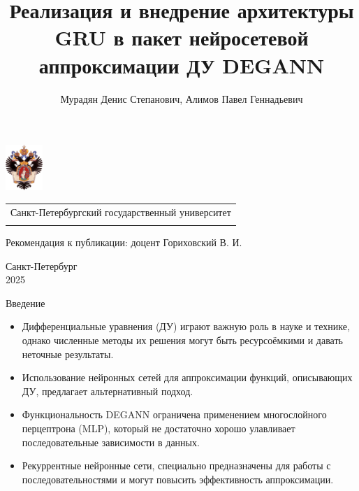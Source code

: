 \documentclass
  [ russian
  , aspectratio=1610 %
  ] {beamer}
\title[GRU в DEGANN]{Реализация и внедрение архитектуры GRU в пакет нейросетевой аппроксимации ДУ DEGANN}
\author[Мурадян Д. С., Алимов П. Г.]{Мурадян Денис Степанович, Алимов Павел Геннадьевич}
\date{}
\makeatletter
\newcommand{\advisorChair}{\my@title@chair@ru}
\newcommand{\publicationRecommendation}{Рекомендация к публикации: доцент Гориховский В. И.}
\makeatother
\begin{document}
{
\begin{frame}
    \includegraphics[width=1.4cm]{figures/SPbGU_Logo.png}
    \vspace{-35pt}
    \hspace{-10pt}
    \begin{center}
        \begin{tabular}{c}
            \scriptsize{Санкт-Петербургский государственный университет} \\[2pt]
            \scriptsize{\advisorChair}
        \end{tabular}
        \titlepage
    \end{center}

    \btVFill

    {\scriptsize
        {\publicationRecommendation}
    }
    \makeatother
    \begin{center}
        \vspace{5pt}
        \scriptsize{Санкт-Петербург\\ 2025}
    \end{center}
\end{frame}
}

\begin{frame}{Введение}
    \begin{itemize}
        \item Дифференциальные уравнения (ДУ) играют важную роль в науке и технике, однако численные методы их решения могут быть ресурсоёмкими и давать неточные результаты.
        \item Использование нейронных сетей для аппроксимации функций, описывающих ДУ, предлагает альтернативный подход.
        \item Функциональность DEGANN ограничена применением многослойного перцептрона (MLP), который не достаточно хорошо улавливает последовательные зависимости в данных.
        \item Рекуррентные нейронные сети, специально предназначены для работы с последовательностями и могут повысить эффективность аппроксимации.
    \end{itemize}
\end{frame}
\end{document}
